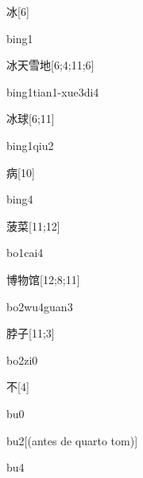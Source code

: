\begin{verbete}[bing1]{冰}[6]
\begin{pronuncia}{bing1}
\end{pronuncia}
\end{verbete}

\begin{verbete}{冰天雪地}[6;4;11;6]
\begin{pronuncia}[\\]{bing1tian1-xue3di4}
\end{pronuncia}
\end{verbete}

\begin{verbete}{冰球}[6;11]
\begin{pronuncia}{bing1qiu2}
\end{pronuncia}
\end{verbete}

\begin{verbete}[bing4]{病}[10]
\begin{pronuncia}{bing4}
\end{pronuncia}
\end{verbete}

\begin{verbete}[bo1cai4]{菠菜}[11;12]
\begin{pronuncia}{bo1cai4}
\end{pronuncia}
\end{verbete}

\begin{verbete}[bo2wu4guan3]{博物馆}[12;8;11]
\begin{pronuncia}{bo2wu4guan3}
\end{pronuncia}
\end{verbete}

\begin{verbete}[bo2zi0]{脖子}[11;3]
\begin{pronuncia}{bo2zi0}
\end{pronuncia}
\end{verbete}

\begin{verbete}[bu0]{不}[4]
\begin{pronuncia}{bu0}
\end{pronuncia}
\begin{pronuncia}{bu2}[(antes de quarto tom)]
\end{pronuncia}
\begin{pronuncia}{bu4}
\end{pronuncia}
\end{verbete}

